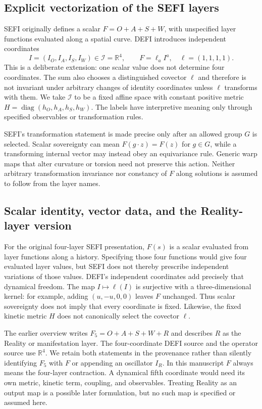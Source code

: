 \documentclass[aip,jmp,reprint,onecolumn,amsmath,amssymb]{revtex4-2}
\newcommand{\I}{\mathcal I}
\begin{document}
\subsection{Explicit vectorization of the SEFI layers}
SEFI originally defines a scalar $F=O+A+S+W$, with unspecified layer functions evaluated along a spatial curve. DEFI introduces independent coordinates
\begin{equation}
 I=(I_O,I_A,I_S,I_W)\in\I=\mathbb R^4,
 \qquad F=\ell_a I^a,\quad \ell=(1,1,1,1).
 \label{eq:identity}
\end{equation}
This is a deliberate extension: one scalar value does not determine four coordinates. The sum also chooses a distinguished covector $\ell$ and therefore is not invariant under arbitrary changes of identity coordinates unless $\ell$ transforms with them. We take $\I$ to be a fixed affine space with constant positive metric $H=\operatorname{diag}(h_O,h_A,h_S,h_W)$. The labels have interpretive meaning only through specified observables or transformation rules.

SEFI's transformation statement is made precise only after an allowed group $G$ is selected. Scalar sovereignty can mean $F(g\cdot z)=F(z)$ for $g\in G$, while a transforming internal vector may instead obey an equivariance rule. Generic warp maps that alter curvature or torsion need not preserve this action. Neither arbitrary transformation invariance nor constancy of $F$ along solutions is assumed to follow from the layer names.

\subsection{Scalar identity, vector data, and the Reality-layer version}
For the original four-layer SEFI presentation, $F(s)$ is a scalar evaluated from layer functions along a history. Specifying those four functions would give four evaluated layer values, but SEFI does not thereby prescribe independent variations of those values. DEFI's independent coordinates add precisely that dynamical freedom. The map $I\mapsto\ell(I)$ is surjective with a three-dimensional kernel: for example, adding $(u,-u,0,0)$ leaves $F$ unchanged. Thus scalar sovereignty does not imply that every coordinate is fixed. Likewise, the fixed kinetic metric $H$ does not canonically select the covector $\ell$.

The earlier overview writes $F_5=O+A+S+W+R$ and describes $R$ as the Reality or manifestation layer.\cite{overview} The four-coordinate DEFI source and the operator source use $\mathbb R^4$.\cite{defi,unified} We retain both statements in the provenance rather than silently identifying $F_5$ with $F$ or appending an oscillator $I_R$. In this manuscript $F$ always means the four-layer contraction. A dynamical fifth coordinate would need its own metric, kinetic term, coupling, and observables. Treating Reality as an output map is a possible later formulation, but no such map is specified or assumed here.
\end{document}
